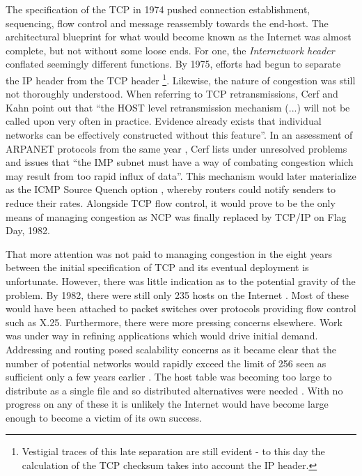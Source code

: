 The specification of the \ac{TCP} \cite{Cerf:2005p452} in 1974 pushed connection establishment, sequencing, flow control and message reassembly towards the end-host.
The architectural blueprint for what would become known as the Internet was almost complete, but not without some loose ends. 
For one, the \textit{Internetwork header} conflated seemingly different functions. 
By 1975, efforts had begun to separate the \ac{IP} header from the \ac{TCP} header \footnote{Vestigial traces of this late separation are still evident - to this day the calculation of the \ac{TCP} checksum takes into account the \ac{IP} header.}.
Likewise, the nature of congestion was still not thoroughly understood.
When referring to \ac{TCP} retransmissions, Cerf and Kahn point out that ``the HOST level retransmission mechanism (...) will not be called upon very often in practice. Evidence already exists that individual networks can be effectively constructed without this feature''. 
In an assessment of \ac{ARPANET} protocols from the same year \cite{Cerf:1974p455}, Cerf lists under unresolved problems and issues that ``the \ac{IMP} subnet must have a way of combating congestion which may result from too rapid influx of data''.
This mechanism would later materialize as the \ac{ICMP} Source Quench option \cite{Postel:1981p463}, whereby routers could notify senders to reduce their rates. 
Alongside \ac{TCP} flow control, it would prove to be the only means of managing congestion as \ac{NCP} was finally replaced by \ac{TCP}/\ac{IP} on Flag Day, 1982.

That more attention was not paid to managing congestion in the eight years between the initial specification of \ac{TCP} and its eventual deployment is unfortunate. 
However, there was little indication as to the potential gravity of the problem.
By 1982, there were still only 235 hosts on the Internet \cite{Lottor:1992p459}. 
Most of these would have been attached to packet switches over protocols providing flow control such as X.25. 
Furthermore, there were more pressing concerns elsewhere. Work was under way in refining applications which would drive initial demand. Addressing and routing posed scalability concerns as it became clear that the number of potential networks would rapidly exceed the limit of 256 seen as sufficient only a few years earlier \cite{Cerf:2005p452}. The host table was becoming too large to distribute as a single file and so distributed alternatives were needed \cite{Mockapetris:1987p527,Birrell:1981p457}. With no progress on any of these it is unlikely the Internet would have become large enough to become a victim of its own success.


